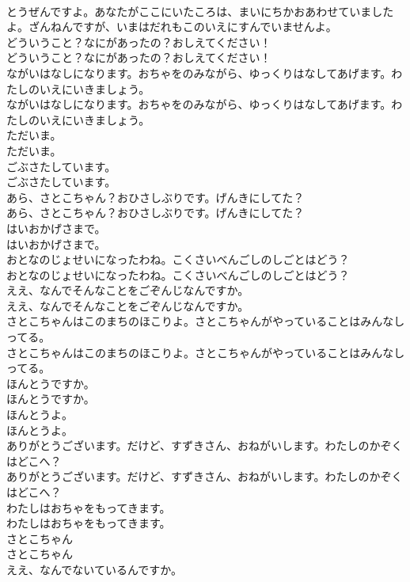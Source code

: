 \documentclass[8pt]{extreport}
\begin{document}
\begin{CJK}{UTF8}{min}
\\	とうぜんですよ。あなたがここにいたころは、まいにちかおあわせていましたよ。ざんねんですが、いまはだれもこのいえにすんでいませんよ。
\\	どういうこと？なにがあったの？おしえてください！
\\	どういうこと？なにがあったの？おしえてください！
\\	ながいはなしになります。おちゃをのみながら、ゆっくりはなしてあげます。わたしのいえにいきましょう。
\\	ながいはなしになります。おちゃをのみながら、ゆっくりはなしてあげます。わたしのいえにいきましょう。
\\	ただいま。
\\	ただいま。
\\	ごぶさたしています。
\\	ごぶさたしています。
\\	あら、さとこちゃん？おひさしぶりです。げんきにしてた？
\\	あら、さとこちゃん？おひさしぶりです。げんきにしてた？
\\	はいおかげさまで。
\\	はいおかげさまで。
\\	おとなのじょせいになったわね。こくさいべんごしのしごとはどう？
\\	おとなのじょせいになったわね。こくさいべんごしのしごとはどう？
\\	ええ、なんでそんなことをごぞんじなんですか。
\\	ええ、なんでそんなことをごぞんじなんですか。
\\	さとこちゃんはこのまちのほこりよ。さとこちゃんがやっていることはみんなしってる。
\\	さとこちゃんはこのまちのほこりよ。さとこちゃんがやっていることはみんなしってる。
\\	ほんとうですか。
\\	ほんとうですか。
\\	ほんとうよ。
\\	ほんとうよ。
\\	ありがとうございます。だけど、すずきさん、おねがいします。わたしのかぞくはどこへ？
\\	ありがとうございます。だけど、すずきさん、おねがいします。わたしのかぞくはどこへ？
\\	わたしはおちゃをもってきます。
\\	わたしはおちゃをもってきます。
\\	さとこちゃん
\\	さとこちゃん
\\	ええ、なんでないているんですか。

\end{CJK}
\end{document}
